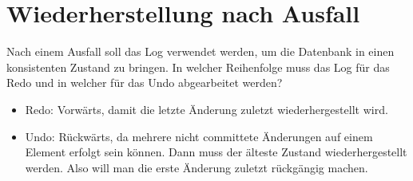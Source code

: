 \section{Wiederherstellung nach Ausfall}

Nach einem Ausfall soll das Log verwendet werden, um die Datenbank in einen konsistenten Zustand zu bringen. In welcher Reihenfolge muss das Log für das Redo und in welcher für das Undo abgearbeitet werden?

\begin{solution}
\begin{itemize}
	\item Redo:
	Vorwärts, damit die letzte Änderung zuletzt wiederhergestellt wird.
	\item Undo:
	Rückwärts, da mehrere nicht committete Änderungen auf einem Element erfolgt sein können. Dann muss der älteste Zustand wiederhergestellt werden. Also will man die erste Änderung zuletzt rückgängig machen.
\end{itemize}
\end{solution}
